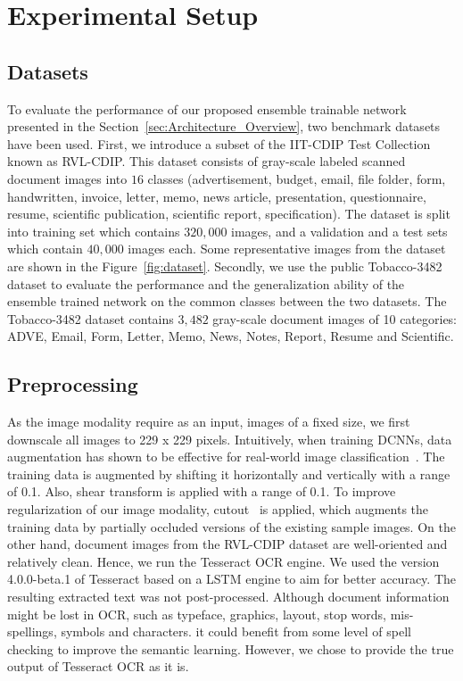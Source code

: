 \documentclass[twocolumn]{svjour3}
\begin{document}
\section{Experimental Setup}
\label{sec:Experimental Setup}
\subsection{Datasets}

To evaluate the performance of our proposed ensemble trainable network presented in the Section~\ref{sec:Architecture_Overview}, two benchmark datasets have been used. First, we introduce a subset of the IIT-CDIP Test Collection known as RVL-CDIP. This dataset consists of gray-scale labeled scanned document images into $16$ classes (advertisement, budget, email, file folder, form, handwritten, invoice, letter, memo, news article, presentation, questionnaire, resume, scientific publication, scientific report, specification). The dataset is split into training set which contains $320,000$ images, and  a validation and a test sets which contain $40,000$ images each. Some representative images from the dataset are shown in the Figure~\ref{fig:dataset}.
Secondly, we use the public Tobacco-3482 dataset to evaluate the performance and the generalization ability of the ensemble trained network on the common classes between the two datasets. The Tobacco-3482 dataset contains $3,482$ gray-scale document images of 10 categories: ADVE, Email, Form, Letter, Memo, News, Notes, Report, Resume and Scientific. 

\subsection{Preprocessing}

As the image modality require as an input, images of a fixed size, we first downscale all images to 229 x 229 pixels. Intuitively, when training DCNNs, data augmentation has shown to be effective for real-world image classification~\cite{Krizhevsky2017ImageNetCW}. The training data is augmented by shifting it horizontally and vertically with a range of 0.1. Also, shear transform is applied with a range of 0.1. To improve regularization of our image modality, cutout~\cite{devries2017improved} is applied, which augments the training data by partially occluded versions of the existing sample images.
On the other hand, document images from the RVL-CDIP dataset are well-oriented and relatively clean. Hence, we run the Tesseract OCR engine. We used the version 4.0.0-beta.1 of Tesseract based on a LSTM engine to aim for better accuracy. The resulting extracted text was not post-processed. Although document information might be lost in OCR, such as typeface, graphics, layout, stop words, mis-spellings, symbols and characters. it could benefit from some level of spell checking to improve the semantic learning. However, we chose to provide the true output of Tesseract OCR as it is.
\end{document}
